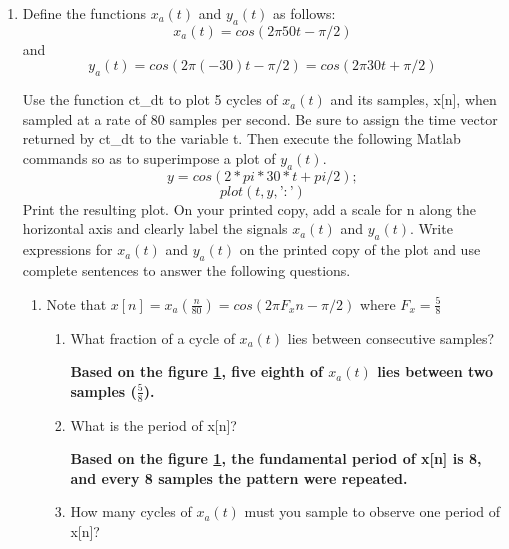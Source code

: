\documentclass[12pt]{article}
\begin{document}
\begin{enumerate}
\item Define the functions $x_a(t)$ and $y_a(t)$ as follows:
$$
x_a(t) = cos(2\pi50t - \pi/2) 
$$
and 
$$
y_a(t) = cos(2\pi(- 30)t - \pi/2) = cos(2\pi30t + \pi/2)
$$

Use the function ct\_dt to plot 5 cycles of $x_a(t)$ and its samples, x[n], when sampled at a rate of 80 samples per second. Be sure to assign the time vector returned by ct\_dt to the variable t. Then execute the following Matlab commands so as to superimpose a plot of $y_a(t)$.
$$
     y = cos(2*pi*30*t + pi/2);
     $$
     $$
     plot(t,y,’:’)
     $$
Print the resulting plot. On your printed copy, add a scale for n along the horizontal axis and clearly label the signals $x_a(t)$ and $y_a(t)$. Write expressions for $x_a(t)$ and $y_a(t)$ on the printed copy of the plot and use complete sentences to answer the following questions.

\begin{enumerate}
\begin{figure}[H]
    \centering
    \begin{minipage}[b]{0.7\textwidth}
        \texttt{[image: images/31.jpg]}
    \end{minipage}
    \caption{The plot of $x_a(t)$, $y_a(t)$, x[n], and y[n].}
    \label{fig:31}
\end{figure}
\item Note that $x[n] = x_a(\frac{n}{80}) = cos(2\pi F_x n-\pi/2)$ where $F_x = \frac{5}{8}$
\begin{enumerate}



\item What fraction of a cycle of $x_a(t)$ lies between consecutive samples?

\textbf{Based on the figure \ref{fig:31}, five eighth of $x_a(t)$ lies between two samples ($\frac{5}{8}$).}



\item What is the period of x[n]?

\textbf{Based on the figure \ref{fig:31}, the fundamental period of x[n] is 8, and every 8 samples the pattern were repeated.}




\item How many cycles of $x_a(t)$ must you sample to observe one period of x[n]?



\end{enumerate}
\end{enumerate}
\end{enumerate}
\end{document}
